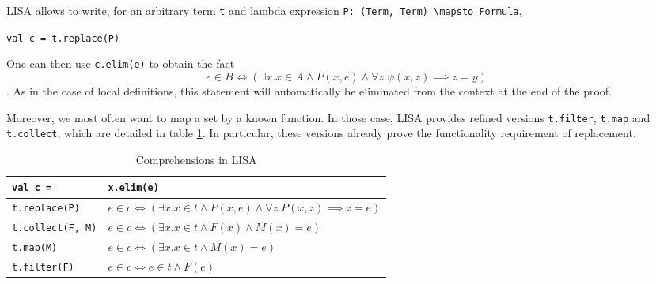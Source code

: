 LISA allows to write, for an arbitrary term \lstinline|t| and lambda expression \lstinline|P: (Term, Term) \mapsto Formula|,
\begin{center}
  \lstinline|val c = t.replace(P)|
\end{center}
One can then use \lstinline|c.elim(e)| to obtain the fact 
$$e \in B \iff (\exists x. x \in A \land P(x, e) \land ∀ z. \psi(x, z) \implies z = y)$$. As in the case of local definitions, this statement will automatically be eliminated from the context at the end of the proof.

Moreover, we most often want to map a set by a known function. In those case, LISA provides refined versions \lstinline|t.filter|, \lstinline|t.map| and \lstinline|t.collect|, which are detailed in table \ref{tab:comprehensions}. In particular, these versions already prove the functionality requirement of replacement.
\begin{table}[h]
  \begin{tabular}{l|l}
    \textbf{\lstinline|val c = |} & \textbf{\lstinline|x.elim(e)|} \\ \hline
    \lstinline|t.replace(P)| & $e \in c \iff (\exists x. x \in t \land P(x, e) \land ∀ z. P(x, z) \implies z = e)$ \\
    \lstinline|t.collect(F, M)| & $e \in c \iff (\exists x. x \in t \land F(x) \land M(x) = e)$ \\
    \lstinline|t.map(M)| & $e \in c \iff (\exists x. x \in t \land M(x) = e)$ \\
    \lstinline|t.filter(F)| & $e \in c \iff e \in t \land F(e)$ \\   
  \end{tabular}
  \caption{Comprehensions in LISA}
  \label{tab:comprehensions}
\end{table}
